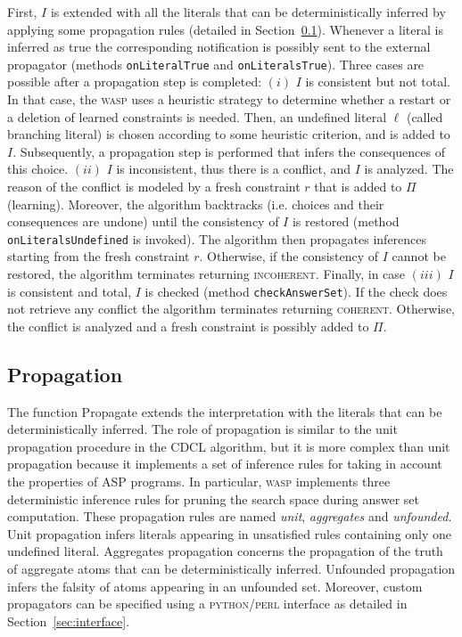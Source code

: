\documentclass[a4paper,12pt]{article}
\newcommand{\wasp}{\textsc{wasp}\xspace}
\newcommand{\pyth}{\textsc{python}\xspace}
\newcommand{\perl}{\textsc{perl}\xspace}
\newcommand{\coherent}{\textsc{coherent}\xspace}
\newcommand{\inco}{\textsc{incoherent}\xspace}
\begin{document}
	First, $I$ is extended with all the literals that can be deterministically inferred by applying some propagation rules (detailed in Section~\ref{sec:propagation}).
	Whenever a literal is inferred as true the corresponding notification is possibly sent to the external propagator (methods \texttt{onLiteralTrue} and \texttt{onLiteralsTrue}).
	Three cases are possible after a propagation step is completed:
	$(i)$ $I$ is consistent but not total. In that case, the \wasp uses a heuristic strategy to determine whether a restart or a deletion of learned constraints is needed. Then, an undefined literal $\ell$ (called branching literal) is chosen according to some heuristic criterion, and is added to $I$. Subsequently, a propagation step is performed that infers the consequences of this choice.
	$(ii)$ $I$ is inconsistent, thus there is a conflict, and $I$ is analyzed. 
	The reason of the conflict is modeled by a fresh constraint $r$ that is added to $\Pi$ (learning).
	Moreover, the algorithm backtracks (i.e. choices and their consequences are undone) until the consistency of $I$ is restored (method \texttt{onLiteralsUndefined} is invoked).
	The algorithm then propagates inferences starting from the fresh constraint $r$. 
	Otherwise, if the consistency of $I$ cannot be restored, the algorithm terminates returning \inco.
	Finally, in case $(iii)$ $I$ is consistent and total, $I$ is checked (method \texttt{checkAnswerSet}). If the check does not retrieve any conflict the algorithm terminates returning \coherent. Otherwise, the conflict is analyzed and a fresh constraint is possibly added to $\Pi$.
	
	\subsection{Propagation}\label{sec:propagation}
	The function Propagate extends the interpretation with the literals that can be deterministically inferred.
	The role of propagation is similar to the unit propagation procedure in the CDCL algorithm, but it is more complex than unit propagation because it 	implements a set of inference rules for taking in account the properties of ASP programs.
	In particular, \wasp implements three deterministic inference rules for pruning the search space during answer set computation. These propagation rules are named \emph{unit}, \emph{aggregates} and \emph{unfounded}.
	Unit propagation infers literals appearing in unsatisfied rules containing only one undefined literal.
	Aggregates propagation concerns the propagation of the truth of aggregate atoms that can be deterministically inferred. Unfounded propagation infers the falsity of atoms appearing in an unfounded set.
	Moreover, custom propagators can be specified using a \pyth/\perl interface as detailed in Section~\ref{sec:interface}.
	
\end{document}
